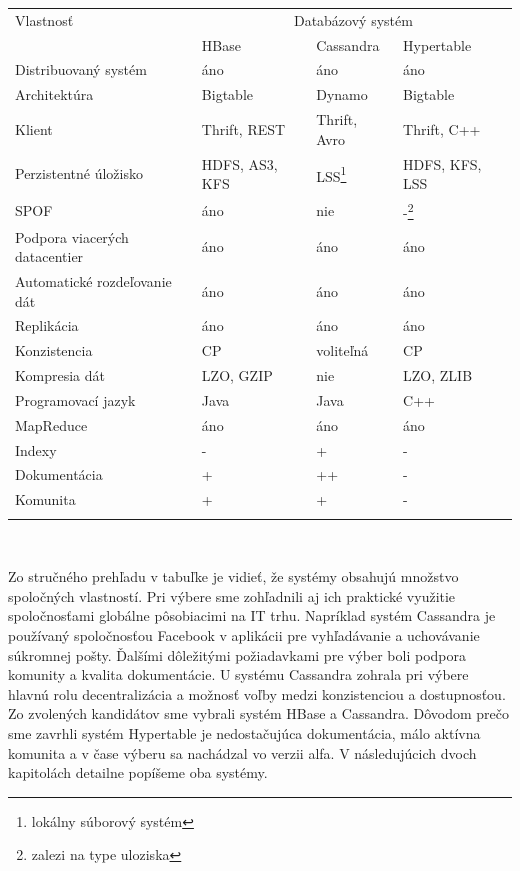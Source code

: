 \documentclass[11pt,twoside,a4paper]{book}
\begin{document}
{\centering\par\bigskip
\begin{tabular}{l@{\hspace{2.5em}}lll}\toprule
Vlastnosť & \multicolumn{3}{c}{Databázový systém} \\
			& \multicolumn{1}{l}{HBase} & \multicolumn{1}{l}{Cassandra} & \multicolumn{1}{l}{Hypertable}\\\midrule\addlinespace

Distribuovaný systém	& áno  & áno & áno 				\\\addlinespace
Architektúra		& Bigtable  & Dynamo & Bigtable	\\\addlinespace
Klient 			& Thrift, REST  & Thrift, Avro & Thrift, C++ 	\\\addlinespace
Perzistentné úložisko	& HDFS, AS3, KFS  & LSS\footnote{lokálny súborový systém} & HDFS, KFS, LSS		\\\addlinespace
SPOF	& áno  & nie & -\footnote{zalezi na type uloziska} 	\\\addlinespace
Podpora viacerých datacentier & áno  & áno & áno 			\\\addlinespace
Automatické rozdeľovanie dát 	& áno  & áno & áno 			\\\addlinespace
Replikácia 		& áno  & áno & áno 				\\\addlinespace
Konzistencia 		& CP  & voliteľná & CP 				\\\addlinespace
Kompresia dát		& LZO, GZIP  & nie & LZO, ZLIB 				\\\addlinespace
Programovací jazyk 	& Java  & Java & C++ 				\\\addlinespace
MapReduce 		& áno  & áno & áno 				\\\addlinespace
Indexy		 	& -  & +  & - 					\\\addlinespace
Dokumentácia		& +  & ++  & - 					\\\addlinespace
Komunita 		& +  & +  & - 					\\\addlinespace\bottomrule

\end{tabular}\\}
\label{tab:Nosql}
\par\bigskip



Zo stručného prehľadu v tabuľke je vidieť, že systémy obsahujú množstvo spoločných vlastností. Pri výbere sme zohľadnili aj ich praktické využitie spoločnosťami globálne pôsobiacimi na IT trhu. Napríklad systém Cassandra je používaný spoločnosťou Facebook v aplikácii pre vyhľadávanie a uchovávanie súkromnej pošty. Ďalšími dôležitými požiadavkami pre výber boli podpora komunity a kvalita dokumentácie. U systému Cassandra zohrala pri výbere hlavnú rolu decentralizácia a možnosť voľby medzi konzistenciou a dostupnosťou. Zo zvolených kandidátov sme vybrali systém HBase a Cassandra. Dôvodom prečo sme zavrhli systém Hypertable je nedostačujúca dokumentácia, málo aktívna komunita a v čase výberu sa nachádzal vo verzii alfa. V následujúcich dvoch kapitolách detailne popíšeme oba systémy.
\end{document}
